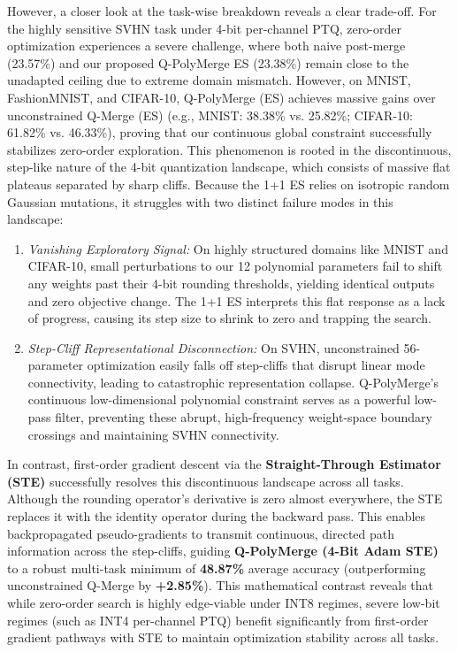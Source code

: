 However, a closer look at the task-wise breakdown reveals a clear trade-off. For the highly sensitive SVHN task under 4-bit per-channel PTQ, zero-order optimization experiences a severe challenge, where both naive post-merge (23.57\%) and our proposed Q-PolyMerge ES (23.38\%) remain close to the unadapted ceiling due to extreme domain mismatch. However, on MNIST, FashionMNIST, and CIFAR-10, Q-PolyMerge (ES) achieves massive gains over unconstrained Q-Merge (ES) (e.g., MNIST: 38.38\% vs. 25.82\%; CIFAR-10: 61.82\% vs. 46.33\%), proving that our continuous global constraint successfully stabilizes zero-order exploration. This phenomenon is rooted in the discontinuous, step-like nature of the 4-bit quantization landscape, which consists of massive flat plateaus separated by sharp cliffs. 
Because the 1+1 ES relies on isotropic random Gaussian mutations, it struggles with two distinct failure modes in this landscape:
\begin{enumerate}
    \item \emph{Vanishing Exploratory Signal:} On highly structured domains like MNIST and CIFAR-10, small perturbations to our 12 polynomial parameters fail to shift any weights past their 4-bit rounding thresholds, yielding identical outputs and zero objective change. The 1+1 ES interprets this flat response as a lack of progress, causing its step size to shrink to zero and trapping the search.
    \item \emph{Step-Cliff Representational Disconnection:} On SVHN, unconstrained 56-parameter optimization easily falls off step-cliffs that disrupt linear mode connectivity, leading to catastrophic representation collapse. Q-PolyMerge's continuous low-dimensional polynomial constraint serves as a powerful low-pass filter, preventing these abrupt, high-frequency weight-space boundary crossings and maintaining SVHN connectivity.
\end{enumerate}

In contrast, first-order gradient descent via the \textbf{Straight-Through Estimator (STE)} successfully resolves this discontinuous landscape across all tasks. Although the rounding operator's derivative is zero almost everywhere, the STE replaces it with the identity operator during the backward pass. This enables backpropagated pseudo-gradients to transmit continuous, directed path information across the step-cliffs, guiding \textbf{Q-PolyMerge (4-Bit Adam STE)} to a robust multi-task minimum of \textbf{48.87\%} average accuracy (outperforming unconstrained Q-Merge by \textbf{+2.85\%}). This mathematical contrast reveals that while zero-order search is highly edge-viable under INT8 regimes, severe low-bit regimes (such as INT4 per-channel PTQ) benefit significantly from first-order gradient pathways with STE to maintain optimization stability across all tasks.

